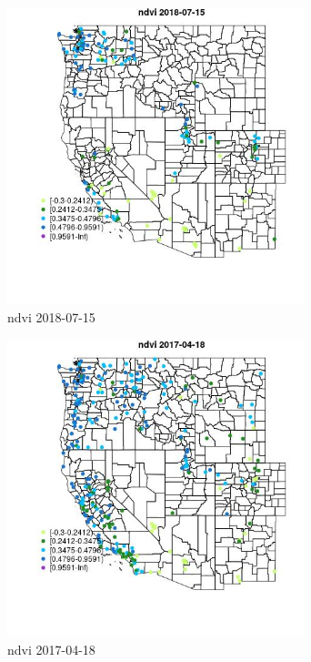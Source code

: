 \begin{figure} 
\centering  
\includegraphics[width=0.77\textwidth]{Code_Outputs/Report_ML_input_PM25_Step4_part_e_de_duplicated_aves_compiled_2019-05-21wNAs_MapObsndvi2018-07-15.jpg} 
\caption{\label{fig:Report_ML_input_PM25_Step4_part_e_de_duplicated_aves_compiled_2019-05-21wNAsMapObsndvi2018-07-15}ndvi 2018-07-15} 
\end{figure} 
 

\begin{figure} 
\centering  
\includegraphics[width=0.77\textwidth]{Code_Outputs/Report_ML_input_PM25_Step4_part_e_de_duplicated_aves_compiled_2019-05-21wNAs_MapObsndvi2017-04-18.jpg} 
\caption{\label{fig:Report_ML_input_PM25_Step4_part_e_de_duplicated_aves_compiled_2019-05-21wNAsMapObsndvi2017-04-18}ndvi 2017-04-18} 
\end{figure} 
 
